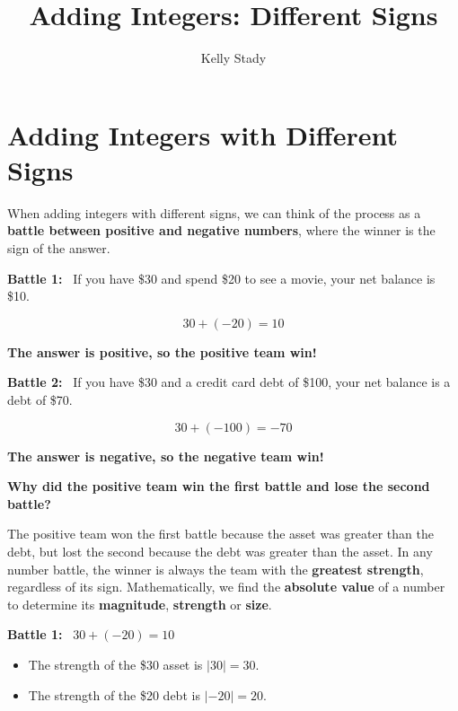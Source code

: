 \documentclass{ximera}[font=12pt]
\title{Adding Integers: Different Signs}   %
\author{Kelly Stady}
\begin{document}
\begin{abstract}

\end{abstract}

\maketitle
\label{xim:AddIntDiffSActivity}


\section*{Adding Integers with Different Signs}

When adding integers with different signs, we can think of the process as a
\textbf{battle between positive and negative numbers}, where the winner is the sign of
the answer.


\textcolor{glaucous}{\textbf{Battle 1:}}  \ If you have \$30 and spend \$20 to see a movie, your net balance is \$10. 

\[ 30 + (-20) = 10 \]

\textcolor{orange!80!black}{\textbf{The answer is positive, so the positive team win!}}


\textcolor{glaucous}{\textbf{Battle 2:}} \ If you have \$30 and a credit card debt of \$100, your net balance is a debt of \$70.


\[ 30 + (-100) = -70 \]

\textcolor{orange!80!black}{\textbf{The answer is negative, so the negative team win!}}

\textbf{Why did the positive team win the first battle and lose the second battle?}

The positive team won the first battle because the asset was greater than the debt, but 
lost the second because the debt was greater than the asset.  In any number battle, the winner is always 
the team with the \textbf{greatest strength}, regardless of its sign.  Mathematically, we find the \textbf{absolute value} 
of a number to determine its \textbf{magnitude}, \textbf{strength} or \textbf{size}.  


\textcolor{glaucous}{\textbf{Battle 1:}} \ $30 + (-20) = 10$  
\begin{itemize}
    \item[] The strength of the \$30 asset is $|30| = 30$.
    \item[] The strength of the \$20 debt is $|-20| = 20$.
\end{itemize}
\end{document}
